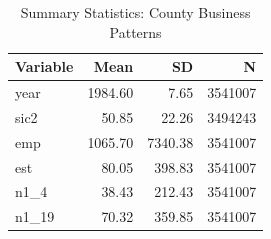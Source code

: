 \begin{table}
\centering
\caption{Summary Statistics: County Business Patterns}
\centering
\begin{tabular}[t]{lrrr}
\toprule
Variable & Mean & SD & N\\
\midrule
year & 1984.60 & 7.65 & 3541007\\
sic2 & 50.85 & 22.26 & 3494243\\
emp & 1065.70 & 7340.38 & 3541007\\
est & 80.05 & 398.83 & 3541007\\
n1\_4 & 38.43 & 212.43 & 3541007\\
\addlinespace
n1\_19 & 70.32 & 359.85 & 3541007\\
\bottomrule
\end{tabular}
\end{table}
